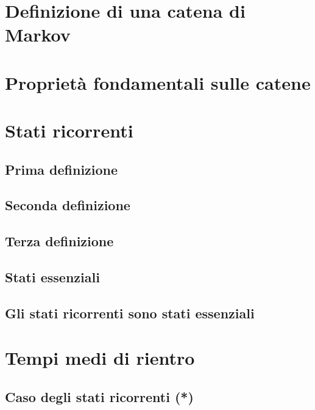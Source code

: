 \documentclass[\main/main.tex]{subfiles}
\begin{document}
\section{Definizione di una catena di Markov}
\section{Proprietà fondamentali sulle catene}
\section{Stati ricorrenti}
\subsection{Prima definizione}
\subsection{Seconda definizione}
\subsection{Terza definizione}
\subsection{Stati essenziali}
\subsection{Gli stati ricorrenti sono stati essenziali}
\section{Tempi medi di rientro}
\subsection{Caso degli stati ricorrenti (*)}
\end{document}
